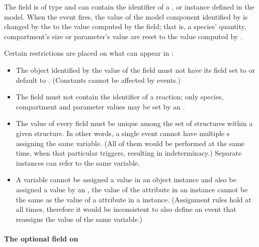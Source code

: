 The  field is of type  and can
contain the identifier of a \Compartment, \Species or \Parameter
instance defined in the model.  When the event fires, the value of
the model component identified by  is changed by
the \EventAssignment to the value computed by the 
field; that is, a species' quantity, compartment's size or
parameter's value are reset to the value computed by .

Certain restrictions are placed on what can appear in
:
\begin{itemize}
  
\item The object identified by the value of the 
  field must not have its  field set to or default
  to .  (Constants cannot be affected by events.)
  
\item The  field must not contain the identifier
  of a reaction; only species, compartment and parameter values
  may be set by an \Event.
  
\item The value of every  field must be unique
  among the set of \EventAssignment structures within a given
  \Event structure.  In other words, a single event cannot have
  multiple \EventAssignment{}s assigning the same variable.  (All
  of them would be performed at the same time, when that
  particular \Event triggers, resulting in indeterminacy.)
  Separate \Event instances can refer to the same variable.
  
\item A variable cannot be assigned a value in an \EventAssignment
  object instance and also be assigned a value by an
  \AssignmentRule, \ie the value of the  attribute
  in an \EventAssignment instance cannot be the same as the value
  of a  attribute in a \AssignmentRule instance.
  (Assignment rules hold at all times, therefore it would be
  inconsistent to also define an event that reassigns the value of
  the same variable.)

\end{itemize}


\paragraph{The optional  field on }

